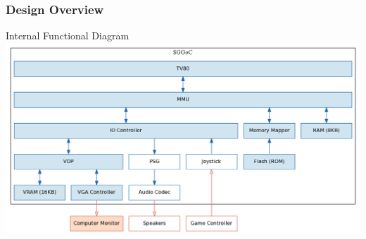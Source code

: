 \documentclass[xcolor=table]{beamer}
\begin{document}
\begin{frame}
    \frametitle{Design Overview}
    \vspace{-0.5\baselineskip}
    \begin{center}
        Internal Functional Diagram \\
        \vspace{0.5\baselineskip}
        \includegraphics[scale=0.3]{../block_diagrams/block_diagram_internal_implemented.png}
    \end{center}
\end{frame}
\end{document}
